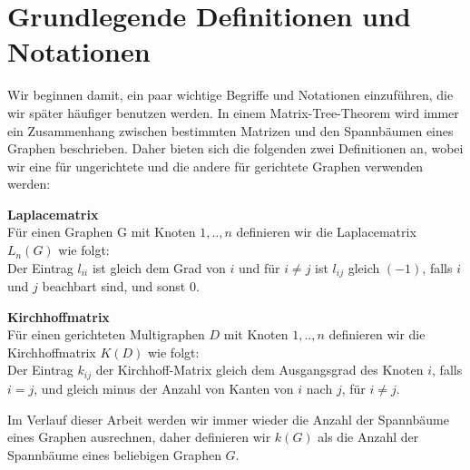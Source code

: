 \graphicspath{{grafiken/}}

\section{Grundlegende Definitionen und Notationen}
Wir beginnen damit, ein paar wichtige Begriffe und Notationen einzuführen, die wir später häufiger benutzen werden.
In einem Matrix-Tree-Theorem wird immer ein Zusammenhang zwischen bestimmten Matrizen und den Spannbäumen eines Graphen beschrieben. Daher bieten sich die folgenden zwei Definitionen an, wobei wir eine für ungerichtete und die andere für gerichtete Graphen verwenden werden:
\begin{Df}\textbf{Laplacematrix}\\
Für einen Graphen G mit Knoten $1,..,n$ definieren wir die Laplacematrix $L_n(G)$ wie folgt:\\
Der Eintrag $l_{ii}$ ist gleich dem Grad von $i$ und für $i \neq j$ ist $l_{ij}$ gleich $(-1)$, falls $i$ und $j$ beachbart sind, und sonst $0$.
\end{Df}
\begin{Df}\textbf{Kirchhoffmatrix}\\
 Für einen gerichteten Multigraphen $D$ mit Knoten $1,..,n$ definieren wir die Kirchhoffmatrix $K(D)$ wie folgt:\\
 Der Eintrag $k_{ij}$ der Kirchhoff-Matrix gleich dem Ausgangsgrad des Knoten $i$, falls $i=j$, und gleich minus der Anzahl von Kanten von $i$ nach $j$, für $i \neq j$.
\end{Df}
Im Verlauf dieser Arbeit werden wir immer wieder die Anzahl der Spannbäume eines Graphen ausrechnen, daher definieren wir $\mathit{k}(G)$ als die Anzahl der Spannbäume eines beliebigen Graphen $G$.
